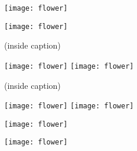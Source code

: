 \documentclass[a4paper,12pt]{report}
\begin{document}

\makeatletter \renewcommand{\fnum@figure}{New caption for figure \thefigure} \makeatother
\begin{figure}[htb]
\begin{center}
\texttt{[image: flower]}
\end{center}
\end{figure}

\begin{figure}[htb]
\begin{center}
\texttt{[image: flower]}
\end{center}
\caption{(inside caption)}
\end{figure}
\clearpage


\begin{figure}[htb]
\begin{center}
\texttt{[image: flower]}
\texttt{[image: flower]}
\end{center}
\caption{(inside caption)}
\end{figure}
\makeatletter \renewcommand{\fnum@figure}{Figure \thefigure} \makeatother
\clearpage


\begin{figure}[htb]
\begin{center}
\texttt{[image: flower]}
\texttt{[image: flower]}
\end{center}
\end{figure}
\clearpage


\begin{figure}[htb]
\begin{center}
\texttt{[image: flower]}
\caption[]{}
\end{center}
\end{figure}

\begin{figure}[htb]
\ContinuedFloat
\begin{center}
\texttt{[image: flower]}
\end{center}
\caption[]{}
\end{figure}
\clearpage
\end{document}
